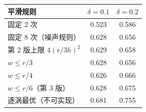 \begin{tabular}{lcc}\toprule 平滑规则 & $\delta=0.1$ & $\delta=0.2$\\\midrule
固定 2 次 & 0.523 & 0.586\\
固定 8 次（噪声规则） & 0.628 & 0.656\\
第 2 版上限 $4(r/3h)^2$ & 0.629 & 0.658\\
$w\le r/3$ & 0.628 & 0.656\\
$w\le r/4$ & 0.626 & 0.666\\
$w\le r/6$（第 3 版） & 0.628 & 0.675\\
逐涡最优（不可实现） & 0.681 & 0.755\\
\bottomrule\end{tabular}